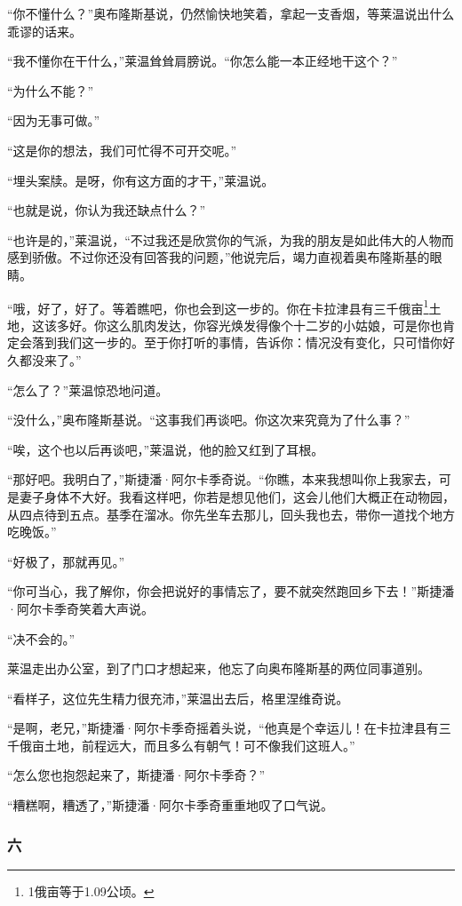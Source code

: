\par “你不懂什么？”奥布隆斯基说，仍然愉快地笑着，拿起一支香烟，等莱温说出什么乖谬的话来。
\par “我不懂你在干什么，”莱温耸耸肩膀说。“你怎么能一本正经地干这个？”
\par “为什么不能？”
\par “因为无事可做。”
\par “这是你的想法，我们可忙得不可开交呢。”
\par “埋头案牍。是呀，你有这方面的才干，”莱温说。
\par “也就是说，你认为我还缺点什么？”
\par “也许是的，”莱温说，“不过我还是欣赏你的气派，为我的朋友是如此伟大的人物而感到骄傲。不过你还没有回答我的问题，”他说完后，竭力直视着奥布隆斯基的眼睛。
\par “哦，好了，好了。等着瞧吧，你也会到这一步的。你在卡拉津县有三千俄亩\footnote{1俄亩等于1.09公顷。}土地，这该多好。你这么肌肉发达，你容光焕发得像个十二岁的小姑娘，可是你也肯定会落到我们这一步的。至于你打听的事情，告诉你：情况没有变化，只可惜你好久都没来了。”
\par “怎么了？”莱温惊恐地问道。
\par “没什么，”奥布隆斯基说。“这事我们再谈吧。你这次来究竟为了什么事？”
\par “唉，这个也以后再谈吧，”莱温说，他的脸又红到了耳根。
\par “那好吧。我明白了，”斯捷潘·阿尔卡季奇说。“你瞧，本来我想叫你上我家去，可是妻子身体不大好。我看这样吧，你若是想见他们，这会儿他们大概正在动物园，从四点待到五点。基季在溜冰。你先坐车去那儿，回头我也去，带你一道找个地方吃晚饭。”
\par “好极了，那就再见。”
\par “你可当心，我了解你，你会把说好的事情忘了，要不就突然跑回乡下去！”斯捷潘·阿尔卡季奇笑着大声说。
\par “决不会的。”
\par 莱温走出办公室，到了门口才想起来，他忘了向奥布隆斯基的两位同事道别。
\par “看样子，这位先生精力很充沛，”莱温出去后，格里涅维奇说。
\par “是啊，老兄，”斯捷潘·阿尔卡季奇摇着头说，“他真是个幸运儿！在卡拉津县有三千俄亩土地，前程远大，而且多么有朝气！可不像我们这班人。”
\par “怎么您也抱怨起来了，斯捷潘·阿尔卡季奇？”
\par “糟糕啊，糟透了，”斯捷潘·阿尔卡季奇重重地叹了口气说。

\subsubsection*{六}

